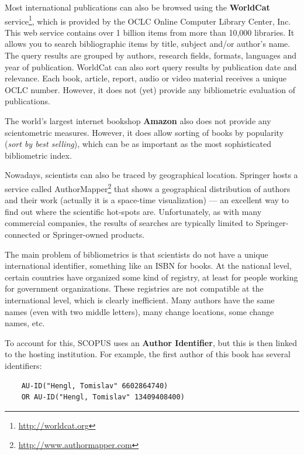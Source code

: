 \documentclass[graybox,envcountchap,sectrefs,UStrade]{svmono}
\begin{document}
Most international publications can also be browsed using the \textbf{WorldCat} service\footnote{\url{http://worldcat.org}}, which is provided by the OCLC Online Computer Library Center, Inc. This web service contains over 1 billion items from more than 10,000 libraries. It allows you to search bibliographic items by title, subject and/or author's name. The query results are grouped by authors, research fields, formats, languages and year of publication. WorldCat can also sort query results by publication date and relevance. Each book, article, report, audio or video material receives a unique OCLC number. However, it does not (yet) provide any bibliometric evaluation of publications.\par

The world's largest internet bookshop \textbf{Amazon} also does not provide any scientometric measures. However, it does allow sorting of books by popularity (\emph{sort by best selling}), which can be as important as the most sophisticated bibliometric index.\par

Nowadays, scientists can also be traced by geographical location. Springer hosts a service called \textsf{AuthorMapper}\footnote{\url{http://www.authormapper.com}} that shows a geographical distribution of authors and their work (actually it is a space-time visualization) --- an excellent way to find out where the scientific hot-spots are. Unfortunately, as with many commercial companies, the results of searches are typically limited to Springer-connected or Springer-owned products. \par

The main problem of bibliometrics is that scientists do not have a unique international identifier, something like an ISBN for books. At the national level, certain countries have organized some kind of registry, at least for people working for government organizations. These registries are not compatible at the international level, which is clearly inefficient. Many authors have the same names (even with two middle letters), many change locations, some change names, etc.\par

To account for this, SCOPUS uses an \textbf{Author Identifier}, but this is then linked to the hosting institution. For example, the first author of this book has several identifiers:

\begin{verbatim}
    AU-ID("Hengl, Tomislav" 6602864740)
    OR AU-ID("Hengl, Tomislav" 13409408400)
\end{verbatim}
\end{document}
